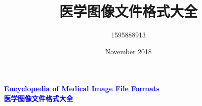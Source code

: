 \documentclass[a4paper,11pt,twoside, openany]{ctexbook}
\title{医学图像文件格式大全}
\author{1595888913 }
\date{November 2018}
\begin{document}
\begin{titlepage}
    \thispagestyle{empty}
    \noindent\fboxsep=0pt
    \par
    \centering
    \Huge{\textbf{\textcolor{blue}{Encyclopedia of Medical Image File Formats \\ 医学图像文件格式大全}}}
    \par
\end{titlepage}
\clearpage


\maketitle
\newpage























\end{document}
